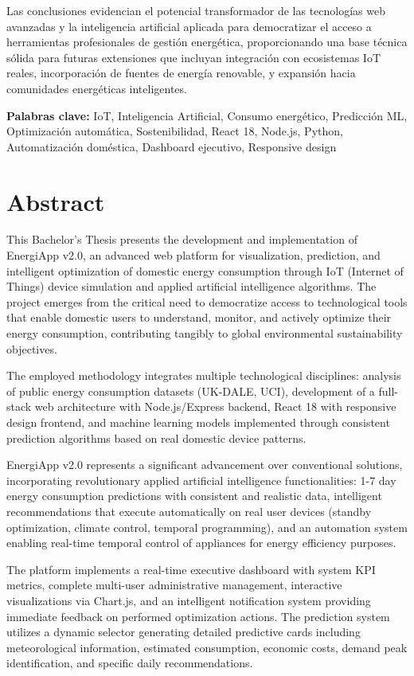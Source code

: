 \documentclass[12pt,a4paper,spanish]{book}
\begin{document}
Las conclusiones evidencian el potencial transformador de las tecnologías web avanzadas y la inteligencia artificial aplicada para democratizar el acceso a herramientas profesionales de gestión energética, proporcionando una base técnica sólida para futuras extensiones que incluyan integración con ecosistemas IoT reales, incorporación de fuentes de energía renovable, y expansión hacia comunidades energéticas inteligentes.

\textbf{Palabras clave:} IoT, Inteligencia Artificial, Consumo energético, Predicción ML, Optimización automática, Sostenibilidad, React 18, Node.js, Python, Automatización doméstica, Dashboard ejecutivo, Responsive design

\chapter*{Abstract}

This Bachelor's Thesis presents the development and implementation of EnergiApp v2.0, an advanced web platform for visualization, prediction, and intelligent optimization of domestic energy consumption through IoT (Internet of Things) device simulation and applied artificial intelligence algorithms. The project emerges from the critical need to democratize access to technological tools that enable domestic users to understand, monitor, and actively optimize their energy consumption, contributing tangibly to global environmental sustainability objectives.

The employed methodology integrates multiple technological disciplines: analysis of public energy consumption datasets (UK-DALE, UCI), development of a full-stack web architecture with Node.js/Express backend, React 18 with responsive design frontend, and machine learning models implemented through consistent prediction algorithms based on real domestic device patterns.

EnergiApp v2.0 represents a significant advancement over conventional solutions, incorporating revolutionary applied artificial intelligence functionalities: 1-7 day energy consumption predictions with consistent and realistic data, intelligent recommendations that execute automatically on real user devices (standby optimization, climate control, temporal programming), and an automation system enabling real-time temporal control of appliances for energy efficiency purposes.

The platform implements a real-time executive dashboard with system KPI metrics, complete multi-user administrative management, interactive visualizations via Chart.js, and an intelligent notification system providing immediate feedback on performed optimization actions. The prediction system utilizes a dynamic selector generating detailed predictive cards including meteorological information, estimated consumption, economic costs, demand peak identification, and specific daily recommendations.
\end{document}
